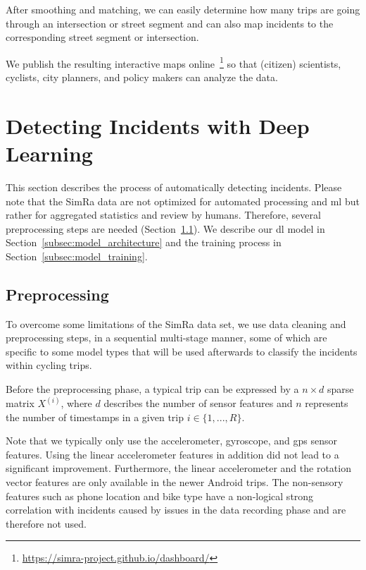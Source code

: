 After smoothing and matching, we can easily determine how many trips are going through an intersection or street segment and can also map incidents to the corresponding street segment or intersection.

We publish the resulting interactive maps online~\footnote{\url{https://simra-project.github.io/dashboard/}} so that (citizen) scientists, cyclists, city planners, and policy makers can analyze the data.

\section{Detecting Incidents with Deep Learning}
\label{sec:detecting_near_miss_incidents}
This section describes the process of automatically detecting incidents.
Please note that the SimRa data are not optimized for automated processing and \ac{ml} but rather for aggregated statistics and review by humans.
Therefore, several preprocessing steps are needed (Section~\ref{subsec:preprocessing}).
We describe our \ac{dl} model in Section~\ref{subsec:model_architecture} and the training process in Section~\ref{subsec:model_training}.


\subsection{Preprocessing}
\label{subsec:preprocessing}
To overcome some limitations of the SimRa data set, we use data cleaning and preprocessing steps, in a sequential multi-stage manner, some of which are specific to some model types that will be used afterwards to classify the incidents within cycling trips.

Before the preprocessing phase, a typical trip can be expressed by a $n \times d$ sparse matrix $X^{(i)}$, where $d$ describes the number of sensor features and $n$ represents the number of timestamps in a given trip $i \in \{1,...,R\}$.

Note that we typically only use the accelerometer, gyroscope, and \ac{gps} sensor features.
Using the linear accelerometer features in addition did not lead to a significant improvement.
Furthermore, the linear accelerometer and the rotation vector features are only available in the newer Android trips.
The non-sensory features such as phone location and bike type have a non-logical strong correlation with incidents caused by issues in the data recording phase and are therefore not used.

